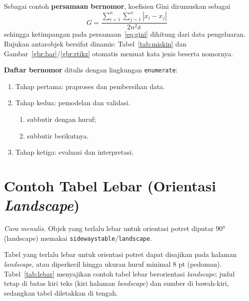 Sebagai contoh \textbf{persamaan bernomor}, koefisien Gini dirumuskan sebagai
\begin{equation}\label{eq:gini}
G = \frac{\sum_{i=1}^{n}\sum_{j=1}^{n} |x_i - x_j|}{2 n^2 \bar{x}}
\end{equation}
sehingga ketimpangan pada persamaan~\eqref{eq:gini} dihitung dari data pengeluaran.
Rujukan antarobjek bersifat dinamis: Tabel~\ref{tab:miskin} dan
Gambar~\ref{gbr:bar}/\ref{gbr:rtikz} otomatis memuat kata jenis beserta nomornya.

\textbf{Daftar bernomor} ditulis dengan lingkungan \texttt{enumerate}:
\begin{enumerate}
  \item Tahap pertama: praproses dan pembersihan data.
  \item Tahap kedua: pemodelan dan validasi.
  \begin{enumerate}
    \item subbutir dengan huruf;
    \item subbutir berikutnya.
  \end{enumerate}
  \item Tahap ketiga: evaluasi dan interpretasi.
\end{enumerate}

\section{Contoh Tabel Lebar (Orientasi \emph{Landscape})}
\emph{Cara menulis.} Objek yang terlalu lebar untuk orientasi potret diputar 90° (landscape) memakai \texttt{sidewaystable}/\texttt{landscape}.

Tabel yang terlalu lebar untuk orientasi potret dapat disajikan pada halaman
\emph{landscape}, atau diperkecil hingga ukuran huruf minimal 8 pt (pedoman).
Tabel~\ref{tab:lebar} menyajikan contoh tabel lebar berorientasi \emph{landscape};
judul tetap di batas kiri teks (kiri halaman \emph{landscape}) dan sumber di
bawah-kiri, sedangkan tabel diletakkan di tengah.

